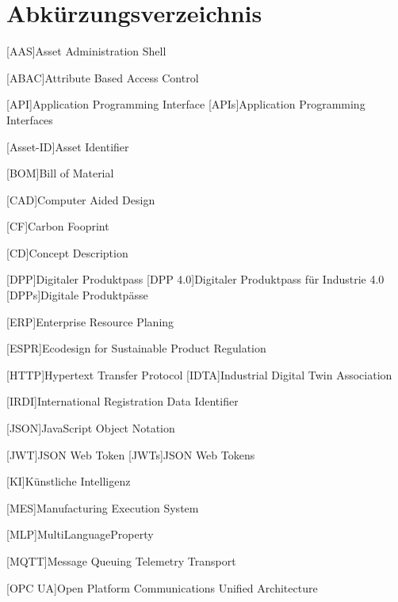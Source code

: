 \section*{Abkürzungsverzeichnis}

{

\begin{singlespacing}
\end{singlespacing}
\begin{acronym}

[AAS]{Asset Administration Shell}

[ABAC]{Attribute Based Access Control}

[API]{Application Programming Interface}
[APIs]{Application Programming Interfaces}

[Asset-ID]{Asset Identifier}

[BOM]{Bill of Material}

[CAD]{Computer Aided Design}

[CF]{Carbon Fooprint}

[CD]{Concept Description}

[DPP]{Digitaler Produktpass}
[DPP 4.0]{Digitaler Produktpass für Industrie 4.0}
[DPPs]{Digitale Produktpässe}

[ERP]{Enterprise Resource Planing}

[ESPR]{Ecodesign for Sustainable Product Regulation}

[HTTP]{Hypertext Transfer Protocol}
[IDTA]{Industrial Digital Twin Association}

[IRDI]{International Registration Data Identifier}

[JSON]{JavaScript Object Notation}

[JWT]{JSON Web Token}
[JWTs]{JSON Web Tokens}

[KI]{Künstliche Intelligenz}

[MES]{Manufacturing Execution System}

[MLP]{MultiLanguageProperty}

[MQTT]{Message Queuing Telemetry Transport}

[OPC UA]{Open Platform Communications Unified Architecture}


\end{acronym}}
